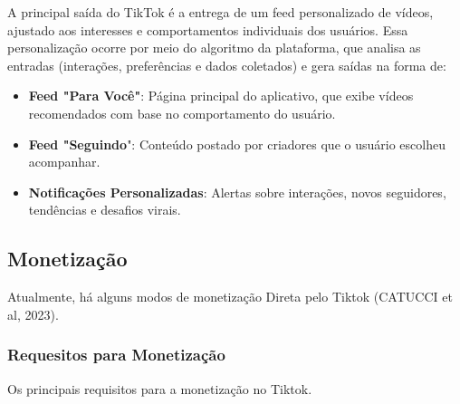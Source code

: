 A principal saída do TikTok é a entrega de um feed personalizado de vídeos, ajustado aos interesses e comportamentos individuais dos usuários. Essa personalização ocorre por meio do algoritmo da plataforma, que analisa as entradas (interações, preferências e dados coletados) e gera saídas na forma de:


\begin{itemize}
    \item \textbf{Feed "Para Você"}: Página principal do aplicativo, que exibe vídeos recomendados com base no comportamento do usuário.
    \item \textbf{Feed "Seguindo}": Conteúdo postado por criadores que o usuário escolheu acompanhar.
    \item \textbf{Notificações Personalizadas}: Alertas sobre interações, novos seguidores, tendências e desafios virais.
\end{itemize}


\subsection{Monetização}

Atualmente, há alguns modos de monetização Direta pelo Tiktok (CATUCCI et al, 2023).

\subsubsection{Requesitos para Monetização}

Os principais requisitos para a monetização no Tiktok.

